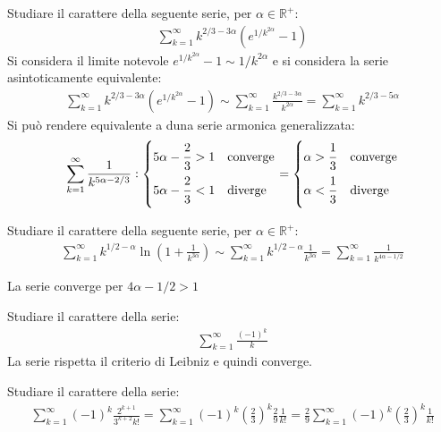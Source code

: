 \documentclass{article}
\numberwithin{equation}{subsection}
\begin{document}
Studiare il carattere della seguente serie, per $\alpha\in\mathbb{R}^+$:
\begin{gather*}
    \displaystyle\sum_{k=1}^\infty k^{2/3-3\alpha}\left(e^{1/k^{2\alpha}}-1\right)
\end{gather*}
Si considera il limite notevole $e^{1/k^{2\alpha}}-1\sim1/k^{2\alpha}$ e si considera la serie asintoticamente equivalente:
\begin{gather*}
    \displaystyle\sum_{k=1}^\infty k^{2/3-3\alpha}\left(e^{1/k^{2\alpha}}-1\right)\sim
    \displaystyle\sum_{k=1}^\infty \frac{k^{2/3-3\alpha}}{k^{2\alpha}}=\sum_{k=1}^\infty k^{2/3-5\alpha}
\end{gather*}
Si può rendere equivalente a duna serie armonica generalizzata:
\begin{gather*}
    \displaystyle\sum_{k=1}^\infty\frac{1}{k^{5\alpha-2/3}}:\begin{cases}
        5\alpha-\displaystyle\frac{\strut 2}{\strut 3}>1 &\mbox{converge}\\
        5\alpha-\displaystyle\frac{\strut 2}{\strut 3}<1 &\mbox{diverge}
    \end{cases}=\begin{cases}
        \alpha>\displaystyle\frac{\strut 1}{\strut 3} &\mbox{converge}\\
        \alpha<\displaystyle\frac{\strut 1}{\strut 3} &\mbox{diverge}
    \end{cases}
\end{gather*}


Studiare il carattere della seguente serie, per $\alpha\in\mathbb{R}^+$:
\begin{gather*}
    \displaystyle\sum_{k=1}^\infty k^{1/2-\alpha}\ln\left(1+\frac{1}{k^{3\alpha}}\right)\sim\sum_{k=1}^\infty k^{1/2-\alpha}\frac{1}{k^{3\alpha}}=\sum_{k=1}^\infty\frac{1}{k^{4\alpha-1/2}}
\end{gather*}

La serie converge per $4\alpha-1/2>1$




Studiare il carattere della serie:
\begin{gather*}
    \displaystyle\sum_{k=1}^\infty\frac{(-1)^k}{k}
\end{gather*}
La serie rispetta il criterio di Leibniz e quindi converge. 


Studiare il carattere della serie:
\begin{gather*}
    \displaystyle\sum_{k=1}^{\infty}(-1)^k\frac{2^{k+1}}{3^{k+2}k!}=
    \sum_{k=1}^\infty(-1)^k\left(\frac{2}{3}\right)^k\frac{2}{9}\frac{1}{k!}=\frac{2}{9}\sum_{k=1}^\infty(-1)^k\left(\frac{2}{3}\right)^k\frac{1}{k!}
\end{gather*}
\end{document}
